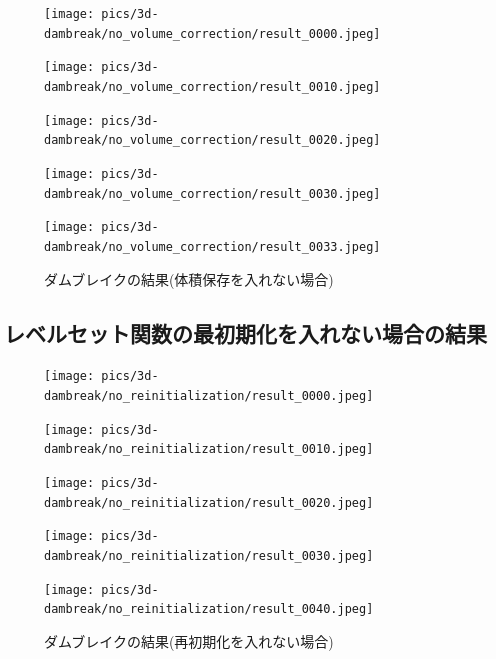 \begin{figure}[H]
	\centering
	\begin{minipage}[b]{0.19\columnwidth}
	    \centering
	    \texttt{[image: pics/3d-dambreak/no\_volume\_correction/result\_0000.jpeg]}
	\end{minipage}
	\begin{minipage}[b]{0.19\columnwidth}
	    \centering
	    \texttt{[image: pics/3d-dambreak/no\_volume\_correction/result\_0010.jpeg]}
	\end{minipage}
	\begin{minipage}[b]{0.19\columnwidth}
	    \centering
	    \texttt{[image: pics/3d-dambreak/no\_volume\_correction/result\_0020.jpeg]}
	\end{minipage}
	\begin{minipage}[b]{0.19\columnwidth}
	    \centering
	    \texttt{[image: pics/3d-dambreak/no\_volume\_correction/result\_0030.jpeg]}
	\end{minipage}
	\begin{minipage}[b]{0.19\columnwidth}
	    \centering
	    \texttt{[image: pics/3d-dambreak/no\_volume\_correction/result\_0033.jpeg]}
	\end{minipage}

	\caption{ダムブレイクの結果(体積保存を入れない場合)}
	\label{fig:dambreak-result}
\end{figure}


\subsection{レベルセット関数の最初期化を入れない場合の結果}

\begin{figure}[H]
	\centering
	\begin{minipage}[b]{0.19\columnwidth}
	    \centering
	    \texttt{[image: pics/3d-dambreak/no\_reinitialization/result\_0000.jpeg]}
	\end{minipage}
	\begin{minipage}[b]{0.19\columnwidth}
	    \centering
	    \texttt{[image: pics/3d-dambreak/no\_reinitialization/result\_0010.jpeg]}
	\end{minipage}
	\begin{minipage}[b]{0.19\columnwidth}
	    \centering
	    \texttt{[image: pics/3d-dambreak/no\_reinitialization/result\_0020.jpeg]}
	\end{minipage}
	\begin{minipage}[b]{0.19\columnwidth}
	    \centering
	    \texttt{[image: pics/3d-dambreak/no\_reinitialization/result\_0030.jpeg]}
	\end{minipage}
	\begin{minipage}[b]{0.19\columnwidth}
	    \centering
	    \texttt{[image: pics/3d-dambreak/no\_reinitialization/result\_0040.jpeg]}
	\end{minipage}

	\caption{ダムブレイクの結果(再初期化を入れない場合)}
	\label{fig:dambreak-result}
\end{figure}

